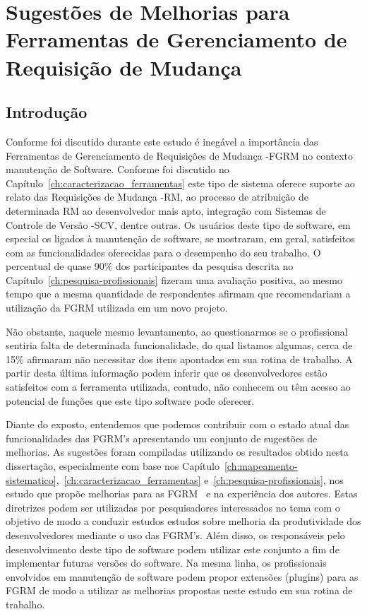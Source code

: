 \chapter{Sugestões de Melhorias para Ferramentas de Gerenciamento de Requisição de Mudança}
\label{ch:extensoes}

\section{Introdução}
\label{sec:sug_melhoria_intro}

Conforme foi discutido durante este estudo é inegável a importância das
Ferramentas de Gerenciamento de Requisições de Mudança \@-\@ FGRM no contexto
manutenção de Software. Conforme foi discutido no
Capítulo~\ref{ch:caracterizacao_ferramentas} este tipo de sistema oferece
suporte ao relato das Requisições de Mudança \@-\@ RM, ao processo de atribuição
de determinada RM ao desenvolvedor mais apto, integração com Sistemas de
Controle de Versão \@-\@ SCV, dentre outras. Os usuários deste tipo de software,
em especial os ligados à manutenção de software, se mostraram, em geral,
satisfeitos com as funcionalidades oferecidas para o desempenho do seu
trabalho. O percentual de quase 90\% dos participantes da pesquisa descrita no
Capítulo~\ref{ch:pesquisa-profissionais} fizeram uma avaliação positiva, ao
mesmo tempo que a mesma quantidade de respondentes afirmam que recomendariam a
utilização da FGRM utilizada em um novo projeto.

Não obstante, naquele mesmo levantamento, ao questionarmos se o profissional
sentiria falta de determinada funcionalidade, do qual listamos algumas, cerca de
15\% afirmaram não necessitar dos itens apontados em sua rotina de trabalho. A
partir desta última informação podem inferir que os desenvolvedores estão
satisfeitos com a ferramenta utilizada, contudo, não conhecem ou têm acesso ao
potencial de funções que este tipo software pode oferecer.

Diante do exposto, entendemos que podemos contribuir com o estado atual das
funcionalidades das FGRM's apresentando um conjunto de sugestões de melhorias.
As sugestões foram compiladas utilizando os resultados obtido nesta dissertação,
especialmente com base nos
Capítulo~\ref{ch:mapeamento-sistematico},~\ref{ch:caracterizacao_ferramentas}
e~\ref{ch:pesquisa-profissionais}, nos estudo que propõe melhorias para as
FGRM~\cite{zimmermann2009improving, bettenburg2008makes, singh2011bug} e na
experiência dos autores. Estas diretrizes podem ser utilizadas por pesquisadores
interessados no tema com o objetivo de modo a conduzir estudos estudos sobre
melhoria da produtividade dos desenvolvedores mediante o uso das FGRM's. Além
disso, os responsáveis pelo desenvolvimento deste tipo de software podem
utilizar este conjunto a fim de implementar futuras versões do software. Na
mesma linha, os profissionais envolvidos em manutenção de software podem propor
extensões (plugins) para as FGRM de modo a utilizar as melhorias propostas neste
estudo em sua rotina de trabalho.

